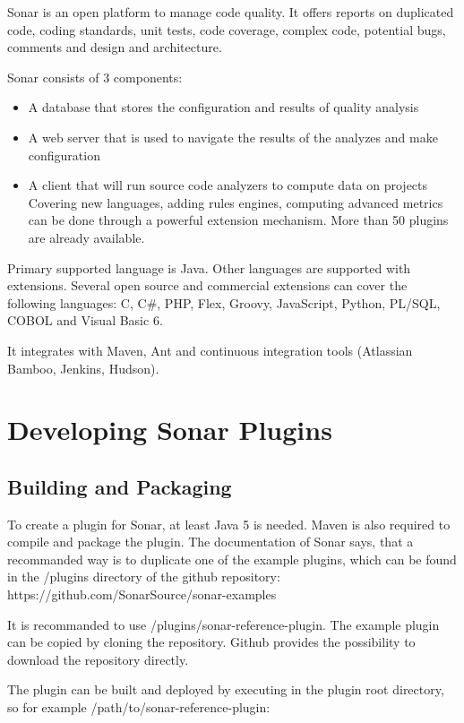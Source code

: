 Sonar is an open platform to manage code quality. It offers reports on duplicated code, coding standards, unit tests, code coverage, complex code, potential bugs, comments and design and architecture.

Sonar consists of 3 components:

\begin{itemize}
\item A database that stores the configuration and results of quality analysis
\item A web server that is used to navigate the results of the analyzes and make configuration
\item A client that will run source code analyzers to compute data on projects
Covering new languages, adding rules engines, computing advanced metrics can be done through a powerful extension mechanism. More than 50 plugins are already available.
\end{itemize}

Primary supported language is Java. Other languages are supported with extensions. Several open source and commercial extensions can cover the following languages: C, C\#, PHP, Flex, Groovy, JavaScript, Python, PL/SQL, COBOL and Visual Basic 6.

It integrates with Maven, Ant and continuous integration tools (Atlassian Bamboo, Jenkins, Hudson).

\section{Developing Sonar Plugins}

\subsection{Building and Packaging}
To create a plugin for Sonar, at least Java 5 is needed. Maven is also required to compile and package the plugin. The documentation of Sonar says, that a recommanded way is to duplicate one of the example plugins, which can be found in the /plugins directory of the github repository: https://github.com/SonarSource/sonar-examples

It is recommanded to use /plugins/sonar-reference-plugin. The example plugin can be copied by cloning the repository. Github provides the possibility to download the repository directly.

The plugin can be built and deployed by executing in the plugin root directory, so for example /path/to/sonar-reference-plugin:

